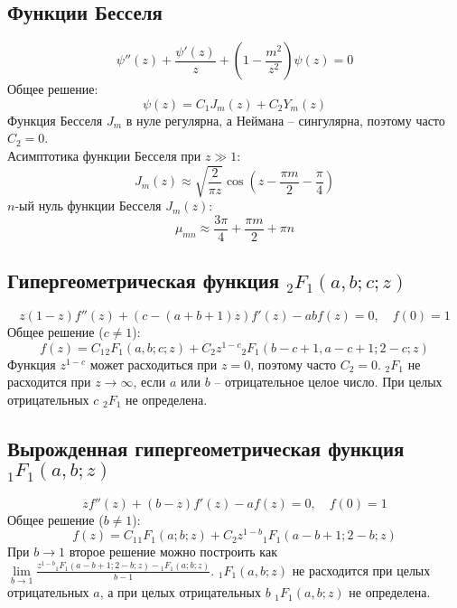 \documentclass[12pt]{article}
\theoremstyle{definition}
\begin{document}
\subsection{Функции Бесселя}
\begin{equation}
    \psi''(z)+\frac{\psi'(z)}{z}+\left(1-\frac{m^2}{z^2}\right)\psi(z)=0
\end{equation}
Общее решение:
\begin{equation}
    \psi(z)=C_1J_m(z)+C_2Y_m(z)
\end{equation}
Функция Бесселя $J_m$ в нуле регулярна, а Неймана -- сингулярна, поэтому часто $C_2=0$.\\
Асимптотика функции Бесселя при $z\gg1$:
\begin{equation}
    J_m(z)\approx\sqrt{\frac{2}{\pi z}}\cos\left(z-\frac{\pi m}{2}-\frac{\pi}{4}\right)
\end{equation}
$n$-ый нуль функции Бесселя $J_m(z)$:
\begin{equation}
    \mu_{mn}\approx\frac{3\pi}{4}+\frac{\pi m}{2}+\pi n
\end{equation}
\subsection{Гипергеометрическая функция $_2F_1(a,b;c;z)$}
\begin{equation}
    z(1-z)f''(z)+(c-(a+b+1)z)f'(z)-abf(z)=0,\quad f(0)=1
\end{equation}
Общее решение ($c\neq1$):
\begin{equation}
    f(z)=C_1{_2}F_1(a,b;c;z)+C_2z^{1-c}{_2}F_1(b-c+1,a-c+1;2-c;z)
\end{equation}
Функция $z^{1-c}$ может расходиться при $z=0$, поэтому часто $C_2=0$. $_2F_1$ не расходится при $z\rightarrow\infty$, если $a$ или $b$ -- отрицательное целое число. При целых отрицательных $c$ $_2F_1$ не определена.
\subsection{Вырожденная гипергеометрическая функция $_1F_1(a,b;z)$}
\begin{equation}
    zf''(z)+(b-z)f'(z)-af(z)=0,\quad f(0)=1
\end{equation}
Общее решение ($b\neq1$):
\begin{equation}
    f(z)=C_1{_1}F_1(a;b;z)+C_2z^{1-b}{_1}F_1(a-b+1;2-b;z)
\end{equation}
При $b\rightarrow1$ второе решение можно построить как $\lim\limits_{b\rightarrow1}\frac{z^{1-b}{_1}F_1(a-b+1;2-b;z)-{_1}F_1(a;b;z)}{b-1}$. $_1F_1(a,b;z)$ не расходится при целых отрицательных $a$, а при целых отрицательных $b$ $_1F_1(a,b;z)$ не определена.
\end{document}
